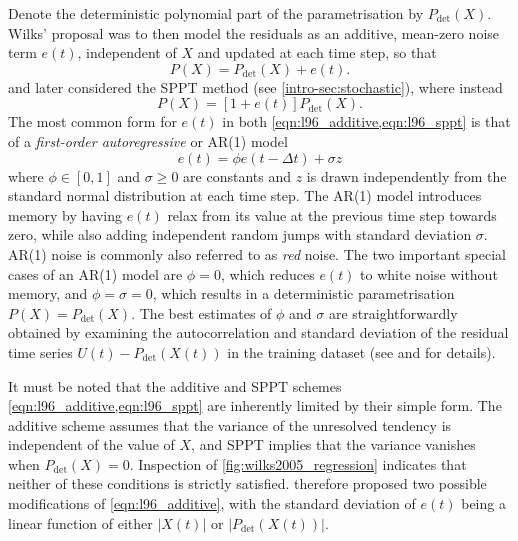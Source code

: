 \documentclass[../main.tex]{subfiles}
\begin{document}
Denote the deterministic polynomial part of the parametrisation by
$P_\mathrm{det}(X)$. Wilks' proposal was to then model the residuals as an
additive, mean-zero noise term $e(t)$, independent of $X$ and updated at each
time step, so that
\begin{equation} \label{eqn:l96_additive}
    P(X) = P_\mathrm{det}(X) + e(t).
\end{equation}
\textcite{arnold2013} and later \textcite{christensen2015} considered the SPPT
method (see \cref{intro-sec:stochastic}), where instead
\begin{equation} \label{eqn:l96_sppt}
    P(X) = [1 + e(t)] P_\mathrm{det}(X).
\end{equation}
The most common form for $e(t)$ in both \cref{eqn:l96_additive,eqn:l96_sppt} is
that of a \emph{first-order autoregressive} or AR(1) model
\begin{equation} \label{eqn:ar1}
    e(t) = \phi e(t - \Delta t) + \sigma z
\end{equation}
where $\phi \in [0,1]$ and $\sigma  \geq 0$ are constants and $z$ is drawn
independently from the standard normal distribution at each time step. The
AR(1) model introduces memory by having $e(t)$ relax from its value at the
previous time step towards zero, while also adding independent random jumps
with standard deviation $\sigma$. AR(1) noise is commonly also referred to as
\emph{red} noise. The two important special cases of an AR(1) model are $\phi =
0$, which reduces $e(t)$ to white noise without memory, and $\phi = \sigma =
0$, which results in a deterministic parametrisation $P(X) =
P_\mathrm{det}(X)$. The best estimates of $\phi$ and $\sigma$ are
straightforwardly obtained by examining the autocorrelation and standard
deviation of the residual time series $U(t) - P_\mathrm{det}(X(t))$ in the
training dataset (see \textcite{arnold2013} and \textcite[Chapter 9]{wilks2011}
for details).

It must be noted that the additive and SPPT schemes
\cref{eqn:l96_additive,eqn:l96_sppt} are inherently limited by their simple
form. The additive scheme assumes that the variance of the unresolved tendency
is independent of the value of $X$, and SPPT implies that the variance vanishes
when $P_\mathrm{det}(X)=0$. Inspection of \cref{fig:wilks2005_regression}
indicates that neither of these conditions is strictly satisfied.
\textcite{arnold2013} therefore proposed two possible modifications of
\cref{eqn:l96_additive}, with the standard deviation of $e(t)$ being a linear
function of either $|X(t)|$ or $|P_\mathrm{det}(X(t))|$.
\end{document}

